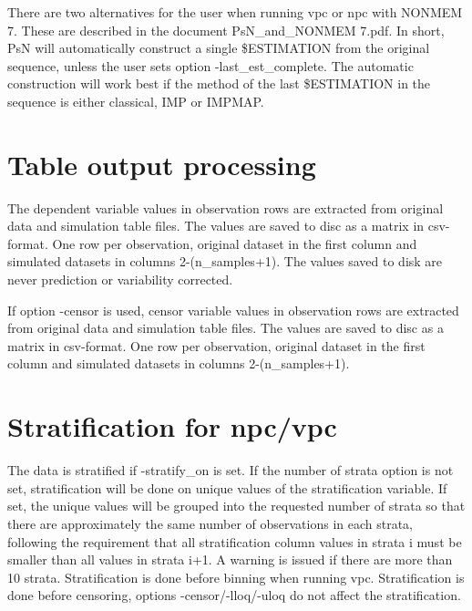 There are two alternatives for the user when running vpc or npc with NONMEM 7. These are described in the document PsN\_and\_NONMEM 7.pdf. In short, PsN will automatically construct a single \$ESTIMATION from the original sequence, unless the user sets option -last\_est\_complete. The automatic construction will work best if the method of the last \$ESTIMATION in the sequence is either classical, IMP or IMPMAP.

\section{Table output processing}
The dependent variable values in observation rows are extracted from original data and simulation table files. The values are saved to disc as a matrix in csv-format. One row per observation, original dataset in the first column and simulated datasets in columns 2-(n\_samples+1). The values saved to disk are never prediction or variability corrected.

If option -censor is used, censor variable values in observation rows are extracted from original data and simulation table files. The values are saved to disc as a matrix in csv-format. One row per observation, original dataset in the first column and simulated datasets in columns 2-(n\_samples+1).

\section{Stratification for npc/vpc}
The data is stratified if -stratify\_on is set. If the number of strata option is not set, stratification will be done on unique values of the stratification variable. If set, the unique values will be grouped into the requested number of strata so that there are approximately the same number of observations in each strata, following the requirement that all stratification column values in strata i must be smaller than all values in strata i+1. A warning is issued if there are more than 10 strata. Stratification is done before binning when running vpc. Stratification is done before censoring, options -censor/-lloq/-uloq do not affect the stratification.

